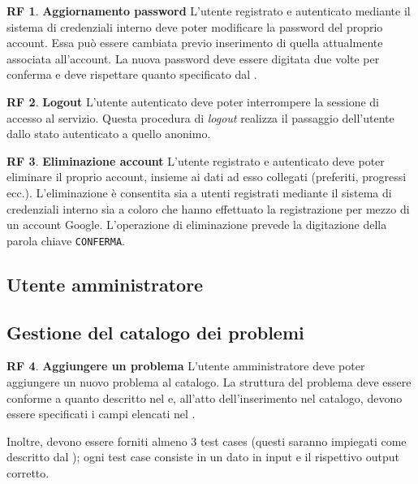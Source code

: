 \documentclass[11pt, a4paper]{article}
\theoremstyle{definition}
\newtheorem{funcreq}{RF} %
\begin{document}
\begin{funcreq}
\label{updateaccount}
\textbf{Aggiornamento password }
L'utente registrato e autenticato mediante il sistema di credenziali interno
deve poter modificare la password del proprio account. Essa può essere cambiata
previo inserimento di quella attualmente associata all'account. La nuova
password deve essere digitata due volte per conferma e deve rispettare quanto
specificato dal \textcolor{blue}{}.
\end{funcreq}
    
\begin{funcreq}
\label{logout}
\textbf{Logout }
L'utente autenticato deve poter interrompere la sessione di accesso
al servizio. Questa procedura di \textit{logout} realizza il passaggio dell'utente
dallo stato autenticato a quello anonimo.
\end{funcreq}

\begin{funcreq}
\textbf{Eliminazione account }
L'utente registrato e autenticato deve poter eliminare il proprio account,
insieme ai dati ad esso collegati (preferiti, progressi ecc.).
L'eliminazione è consentita sia a utenti registrati mediante il sistema di
credenziali interno sia a coloro che hanno effettuato la registrazione per
mezzo di un account Google. L'operazione di eliminazione prevede la
digitazione della parola chiave \texttt{CONFERMA}.
\end{funcreq}

\begin{center}
    \section*{Utente amministratore}
\end{center}

\subsection{Gestione del catalogo dei problemi}\label{gestcatalogo}

\begin{funcreq}
\textbf{Aggiungere un problema }
L'utente amministratore deve poter aggiungere un nuovo problema al catalogo.
La struttura del problema deve essere conforme a quanto descritto nel
\textcolor{blue}{}
e, all'atto dell'inserimento nel catalogo, devono essere specificati i campi
elencati nel \textcolor{blue}{}.

Inoltre, devono essere forniti almeno 3 test cases (questi saranno impiegati
come descritto dal \textcolor{blue}{});
ogni test case consiste in un dato in input e il rispettivo output corretto.
\end{funcreq}
\end{document}
